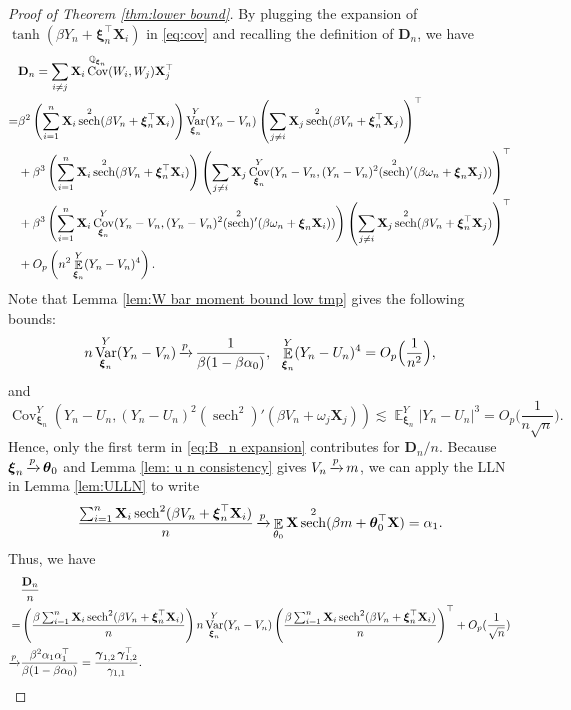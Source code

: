 \documentclass[preprint,reqno]{imsart}
\newcommand{\ttheta}{\boldsymbol{\theta}}
\DeclareMathOperator{\xp}{\xrightarrow{\mathnormal p}}
\DeclareMathOperator{\ggamma}{\boldsymbol{\gamma}}
\DeclareMathOperator{\sech}{sech}
\DeclareMathOperator{\EE}{\mathbb{E}}
\DeclareMathOperator{\Var}{Var}
\DeclareMathOperator{\Cov}{Cov}
\DeclareMathOperator{\QQ}{\mathbb{Q}}
\newcommand{\X}{\mathbf{X}}
\newcommand{\xxi}{\boldsymbol \xi}
\DeclareMathOperator{\sumin}{\sum_{\mathnormal i=1}^{\mathnormal n}}
\begin{document}
\begin{appendix}
\begin{proof}[Proof of Theorem \ref{thm:lower bound}]
By plugging the expansion of $\tanh(\beta Y_n + \xxi_n^\top \X_i)$ in \eqref{eq:cov} and recalling the definition of $\mathbf{D}_n$, we have
\begin{equation}\label{eq:B_n expansion}
\begin{aligned}
     & \mathbf{D}_n = \sum_{i \neq j} \X_i  \Cov^{\QQ_{\xxi_n}}(W_i, W_j) \X_j^\top \\
    =& \beta^2  \left( \sumin \X_i \sech^2(\beta V_n + \xxi_n^\top \X_i) \right)  \Var_{\xxi_n}^{Y}(Y_n - V_n) \left( \sum_{j \neq i} \X_j \sech^2(\beta V_n + \xxi_n^\top \X_j) \right)^\top \\
    &+ \beta^3 \left(\sumin \X_i \sech^2(\beta V_n + \xxi_n^\top \X_i)\right) \left(\sum_{j \neq i} \X_j \Cov_{\xxi_n}^{Y} (Y_n - V_n, (Y_n - V_n)^2 (\sech^2)'(\beta \omega_n + \xxi_n \X_j)) \right)^\top \\
    &+ \beta^3 \left(\sumin \X_i \Cov_{\xxi_n}^{Y} (Y_n - V_n, (Y_n - V_n)^2 (\sech^2)'(\beta \omega_n + \xxi_n \X_i)) \right) \left( \sum_{j \neq i} \X_j \sech^2(\beta V_n + \xxi_n^\top \X_j) \right)^\top \\
    &+ O_p \left(n^2 \EE_{\xxi_n}^{Y}(Y_n - V_n)^4 \right).
\end{aligned}
\end{equation}
Note that Lemma \ref{lem:W bar moment bound low tmp} gives the following bounds: %
$$n \Var_{\xxi_n}^{Y}(Y_n - V_n) \xp \frac{1}{\beta(1 - \beta \alpha_0)}, ~~\EE_{\xxi_n}^{Y}(Y_n - U_n)^4 = O_p \Big(\frac{1}{n^2}\Big),$$
and
$$\Cov_{\xxi_n}^{Y}(Y_n - U_n, (Y_n - U_n)^2 (\sech^2)'(\beta V_n + \omega_j \X_j)) 
\lesssim \EE_{\xxi_n}^{Y} |Y_n - U_n|^3 = O_p\Big( \frac{1}{n \sqrt{n}}\Big).$$
Hence, only the first term in \eqref{eq:B_n expansion} contributes for $\mathbf{D}_n/n$. Because $\xxi_n \xp \ttheta_0$ and Lemma \ref{lem: u n consistency} gives $V_n \xp m$, we can apply the LLN in Lemma \ref{lem:ULLN} to write
\begin{align*}
    \frac{\sumin \X_i \sech^2(\beta V_n + \xxi_n^\top \X_i)}{n} \xp \EE_{\theta_0} \X \sech^2(\beta m + \ttheta_0^\top \X) = \alpha_1.
\end{align*}
Thus, we have
\begin{align}
    &\frac{\mathbf{D}_n}{n} \label{eq:lower bound variance B_n} \\
    =& \left( \frac{\beta \sumin \X_i \sech^2(\beta V_n + \xxi_n^\top \X_i)}{n} \right)  n\Var_{\xxi_n}^{Y}(Y_n - V_n) \left( \frac{\beta \sumin \X_i \sech^2(\beta V_n + \xxi_n^\top \X_i)}{n} \right)^\top + O_p(\frac{1}{\sqrt{n}}) \notag \\
    \xp& \frac{\beta^2 \alpha_1 \alpha_1^\top}{\beta(1 - \beta \alpha_0)} = \frac{\ggamma_{1,2} \ggamma_{1,2}^\top}{\gamma_{1,1}}. \notag
\end{align}


\end{proof}
\end{appendix}
\end{document}
